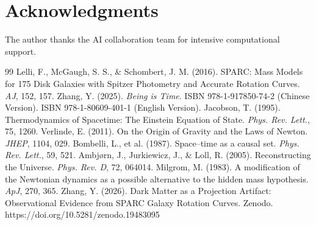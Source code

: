 \documentclass[12pt,a4paper]{article}
\begin{document}
\section*{Acknowledgments}
The author thanks the AI collaboration team for intensive computational support.

\begin{thebibliography}{99}
 Lelli, F., McGaugh, S. S., \& Schombert, J. M. (2016). SPARC: Mass Models for 175 Disk Galaxies with Spitzer Photometry and Accurate Rotation Curves. \textit{AJ}, 152, 157.
 Zhang, Y. (2025). \textit{Being is Time}. ISBN 978-1-917850-74-2 (Chinese Version). ISBN 978-1-80609-401-1 (English Version).
 Jacobson, T. (1995). Thermodynamics of Spacetime: The Einstein Equation of State. \textit{Phys. Rev. Lett.}, 75, 1260.
 Verlinde, E. (2011). On the Origin of Gravity and the Laws of Newton. \textit{JHEP}, 1104, 029.
 Bombelli, L., et al. (1987). Space–time as a causal set. \textit{Phys. Rev. Lett.}, 59, 521.
 Ambjørn, J., Jurkiewicz, J., \& Loll, R. (2005). Reconstructing the Universe. \textit{Phys. Rev. D}, 72, 064014.
 Milgrom, M. (1983). A modification of the Newtonian dynamics as a possible alternative to the hidden mass hypothesis. \textit{ApJ}, 270, 365.
 Zhang, Y. (2026). Dark Matter as a Projection Artifact: Observational Evidence from SPARC Galaxy Rotation Curves. Zenodo. https://doi.org/10.5281/zenodo.19483095
\end{thebibliography}
\end{document}
